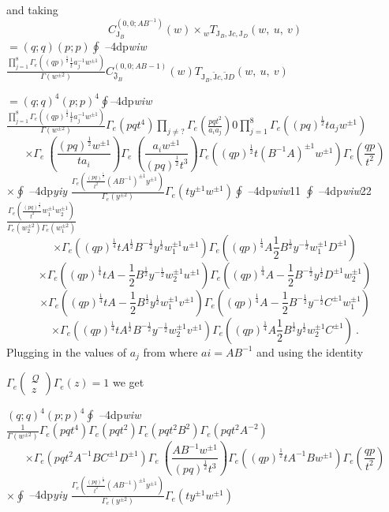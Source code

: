 \documentclass[a4paper,12pt]{article}
\begin{document}
and taking
$$
C_{\mathrm{J}_{B}}^{(0,0;AB^{-1})}(w)\times {}_{w}T_{\mathrm{J}_{B},\mathrm{J}c,\mathrm{J}_{D}}(w,\ u,\ v)
$$
$=(q;q)(p;p)\displaystyle \oint$ --4dp{\it wiw} $\displaystyle \frac{\prod_{j=1}^{8}\Gamma_{e}((qp)^{\frac{1}{2}}\frac{1}{t}a_{j}^{-1}w^{\pm 1})}{\Gamma(w^{\pm 2})}C_{\mathfrak{J}_{B}}^{(0,0;AB- 1)}(w)T_{\mathrm{J}_{B},\tilde{\mathrm{J}}c,\tilde{\mathrm{J}}D}(w,\ u,\ v)$

$=(q;q)^{4}(p;p)^{4}\displaystyle \oint$--4dp{\it wiw} $\displaystyle \frac{\prod_{j=1}^{8}\Gamma_{e}((qp)^{\frac{1}{2}}\frac{1}{t}a_{j}^{-1}w^{\pm 1})}{\Gamma(w^{\pm 2})}\Gamma_{e}(pqt^{4})\prod_{j\neq?}\Gamma_{e}(\frac{pqt^{2}}{a_{i}a_{j}})0\prod_{j=1}^{8}\Gamma_{e}((pq)^{\frac{1}{2}}ta_{j}w^{\pm 1})$
$$
\times\Gamma_{e}\ (\frac{(pq)^{\frac{1}{2}}w^{\pm 1}}{ta_{i}})\Gamma_{e}\ (\frac{a_{i}w^{\pm 1}}{(pq)^{\frac{1}{2}}t^{3}})\Gamma_{e}((qp)^{\frac{1}{2}}t(B^{-1}A)^{\pm 1}w^{\pm 1})\Gamma_{e}(\frac{qp}{t^{2}})
$$
$\displaystyle \times\oint$ --4dp{\it yiy} $\displaystyle \frac{\Gamma_{e}(\frac{(pq)^{\frac{1}{2}}}{t^{2}}(AB^{-1})^{\pm 1}y^{\pm 1})}{\Gamma_{e}(y^{\pm 2})}\Gamma_{e}(ty^{\pm 1}w^{\pm 1})\oint$ --4dp{\it wiw}11 $\displaystyle \oint$ --4dp{\it wiw}22 $\displaystyle \frac{\Gamma_{e}(\frac{(pq)^{\frac{1}{2}}}{t^{2}}w_{1}^{\pm 1}w_{2}^{\pm 1})}{\Gamma_{e}(w_{2}^{\pm 2})\Gamma_{e}(w_{1}^{\pm 2})}$
$$
\times\Gamma_{e}((qp)^{\frac{1}{4}}tA^{\frac{1}{2}}B^{-\frac{1}{2}}y^{\frac{1}{2}}w_{1}^{\pm 1}u^{\pm 1})\Gamma_{e}((qp)^{\frac{1}{4}}A\frac{1}{2}B^{\frac{1}{2}}y^{-\frac{1}{2}}w_{1}^{\pm 1}D^{\pm 1})
$$
$$
\times\Gamma_{e}((qp)^{\frac{1}{4}}tA-\frac{1}{2}B^{\frac{1}{2}}y^{-\frac{1}{2}}w_{2}^{\pm 1}u^{\pm 1})\Gamma_{e}((qp)^{\frac{1}{4}}A-\frac{1}{2}B^{-\frac{1}{2}}y^{\frac{1}{2}}D^{\pm 1}w_{2}^{\pm 1})
$$
$$
\times\Gamma_{e}((qp)^{\frac{1}{4}}tA-\frac{1}{2}B^{\frac{1}{2}}y^{\frac{1}{2}}w_{1}^{\pm 1}v^{\pm 1})\Gamma_{e}((qp)^{\frac{1}{4}}A-\frac{1}{2}B^{-\frac{1}{2}}y^{-\frac{1}{2}}C^{\pm 1}w_{1}^{\pm 1})
$$
$$
\times\Gamma_{e}((qp)^{\frac{1}{4}}tA^{\frac{1}{2}}B^{-\frac{1}{2}}y^{-\frac{1}{2}}w_{2}^{\pm 1}v^{\pm 1})\Gamma_{e}((qp)^{\frac{1}{4}}A\frac{1}{2}B^{\frac{1}{2}}y^{\frac{1}{2}}w_{2}^{\pm 1}C^{\pm 1})\ .
$$
Plugging in the values of $a_{j}$ from where $ai= AB^{-1}$ and using the identity

$\Gamma_{e}\left(\begin{array}{l}
\mathcal{Q}\\
z
\end{array}\right)\Gamma_{e}(z)=1$ we get

$(q;q)^{4}(p;p)^{4}\displaystyle \oint$ --4dp{\it wiw} $\displaystyle \frac{1}{\Gamma(w^{\pm 2})}\Gamma_{e}(pqt^{4})\Gamma_{e}(pqt^{2})\Gamma_{e}(pqt^{2}B^{2})\Gamma_{e}(pqt^{2}A^{-2})$
$$
\times\Gamma_{e}(pqt^{2}A^{-1}BC^{\pm 1}D^{\pm 1})\Gamma_{e}\ (\frac{AB^{-1}w^{\pm 1}}{(pq)^{\frac{1}{2}}t^{3}})\Gamma_{e}((qp)^{\frac{1}{2}}tA^{-1}Bw^{\pm 1})\Gamma_{e}(\frac{qp}{t^{2}})
$$
$\displaystyle \times\oint$ --4dp{\it yiy} $\displaystyle \frac{\Gamma_{e}(\frac{(pq)^{\frac{1}{2}}}{t^{2}}(AB^{-1})^{\pm 1}y^{\pm 1})}{\Gamma_{e}(y^{\pm 2})}\Gamma_{e}(ty^{\pm 1}w^{\pm 1})$
\end{document}
